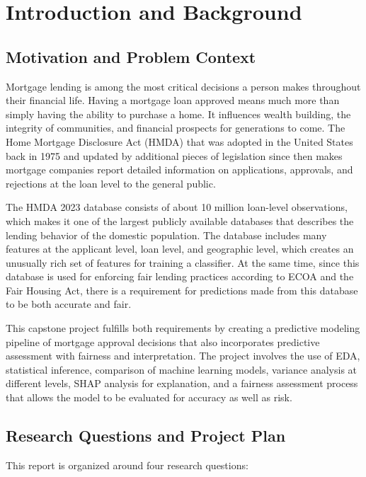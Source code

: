 \documentclass[12pt,letterpaper]{article}
\begin{document}
\tableofcontents
\newpage

\section{Introduction and Background}

\subsection{Motivation and Problem Context}

Mortgage lending is among the most critical decisions a person makes throughout their financial life.
Having a mortgage loan approved means much more than simply having the ability to purchase a home.
It influences wealth building, the integrity of communities, and financial prospects for generations to come.
The Home Mortgage Disclosure Act (HMDA) that was adopted in the United States back in 1975
and updated by additional pieces of legislation since then makes mortgage companies report detailed
information on applications, approvals, and rejections at the loan level to the general public.

The HMDA 2023 database consists of about 10 million loan-level observations, which makes it
one of the largest publicly available databases that describes the lending behavior of the domestic
population. The database includes many features at the applicant level, loan level, and geographic
level, which creates an unusually rich set of features for training a classifier. At the same time, since
this database is used for enforcing fair lending practices according to ECOA and the Fair Housing
Act, there is a requirement for predictions made from this database to be both accurate and fair.

This capstone project fulfills both requirements by creating a predictive modeling pipeline of
mortgage approval decisions that also incorporates predictive assessment with fairness and
interpretation. The project involves the use of EDA, statistical inference, comparison of machine learning models, variance analysis at different levels, SHAP analysis for explanation, and a fairness assessment process that allows the model to be evaluated for accuracy as well as risk.

\subsection{Research Questions and Project Plan}

This report is organized around four research questions:
\end{document}
